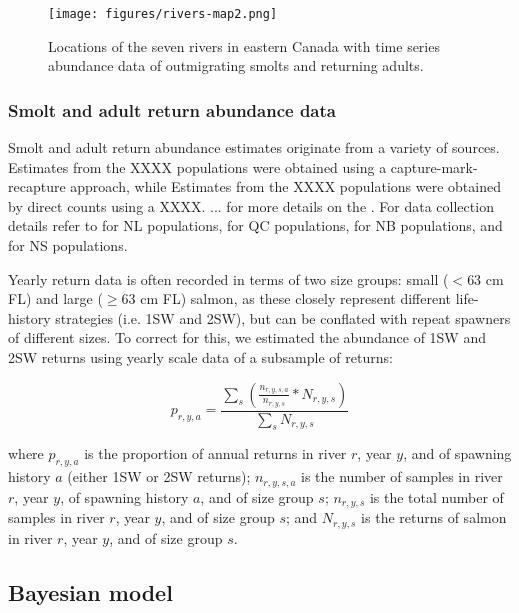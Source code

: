 \documentclass[12pt]{article}
\begin{document}
\begin{figure}[htbp] \centering
    \texttt{[image: figures/rivers-map2.png]}
    \caption{Locations of the seven rivers in eastern Canada with time series abundance data of outmigrating smolts and 
    returning adults.} \label{fig:map} 
\end{figure}

\subsubsection*{Smolt and adult return abundance data}

Smolt and adult return abundance estimates originate from a variety of sources.
Estimates from the XXXX populations were obtained using a capture-mark-recapture approach, while
Estimates from the XXXX populations were obtained by direct counts using a XXXX.
... for more details on the . 
For data collection details refer to 
\citet{Venoitt2018} for NL populations, 
\citet{April2018}  for QC populations,
\citet{Jones2014} for NB populations,
and \citet{Gibson2009} for NS populations. 

Yearly return data is often recorded in terms of two size groups: small ($< 63$ cm
FL) and large ($\geq 63$ cm FL) salmon, as these closely represent different
life-history strategies (i.e. 1SW and 2SW), but can be conflated with repeat
spawners of different sizes. To correct for this, we estimated the abundance
of 1SW and 2SW returns using yearly scale data of a subsample of returns:

\begin{equation}
    p_{r,y,a} = \frac{\sum_{s}{(\frac{n_{r,y,s,a}}{n_{r,y,s}} * N_{r,y,s})}}{\sum_{s}{N_{r,y,s}}}
\end{equation}

where $p_{r,y,a}$ is the proportion of annual returns in river $r$, year $y$,
and of spawning history $a$ (either 1SW or 2SW returns); $n_{r,y,s,a}$ is the
number of samples in river $r$, year $y$, of spawning history $a$, and of size
group $s$; $n_{r,y,s}$ is the total number of samples in river $r$, year $y$,
and of size group $s$; and $N_{r,y,s}$ is the returns of salmon
in river $r$, year $y$, and of size group $s$.

\subsection*{Bayesian model}
\end{document}
